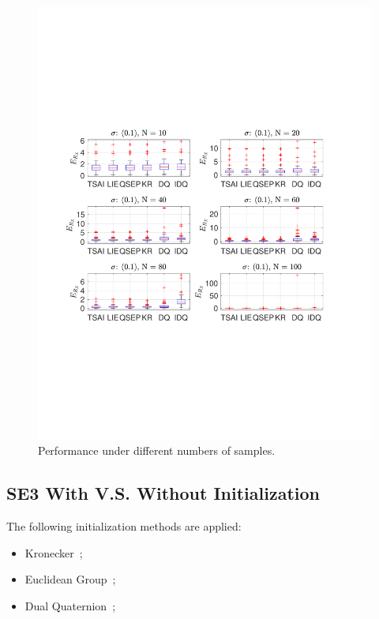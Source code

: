 \documentclass[a4paper]{report}
\begin{document}
\begin{figure}
\includegraphics[scale=0.6]{./hand_eye_figures/conv/conv_t_err_cmp1}
\caption{Performance under different numbers of samples.}
\end{figure}

\subsection{SE3 With V.S. Without Initialization}
The following initialization methods are applied:
\begin{itemize}
	\item Kronecker~\cite{andreff1999line};
	\item Euclidean Group~\cite{park1994robot};
	\item Dual Quaternion~\cite{daniilidis1999hand};
\end{itemize}
\end{document}
